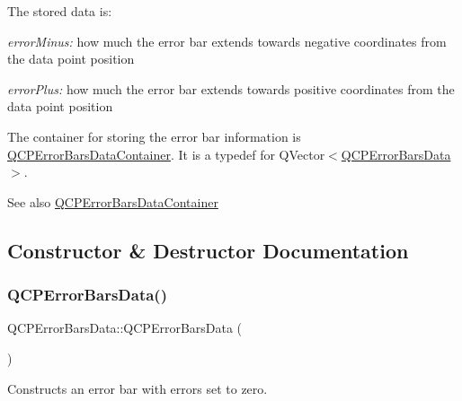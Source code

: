 The stored data is\+: \begin{DoxyItemize}
\item {\itshape error\+Minus\+:} how much the error bar extends towards negative coordinates from the data point position \item {\itshape error\+Plus\+:} how much the error bar extends towards positive coordinates from the data point position\end{DoxyItemize}
The container for storing the error bar information is \hyperlink{qcustomplot_8h_a8c4472a4da738e0ddbf6b03222c39906}{Q\+C\+P\+Error\+Bars\+Data\+Container}. It is a typedef for {\ttfamily Q\+Vector$<$\hyperlink{class_q_c_p_error_bars_data}{Q\+C\+P\+Error\+Bars\+Data}$>$}.

\begin{DoxySeeAlso}{See also}
\hyperlink{qcustomplot_8h_a8c4472a4da738e0ddbf6b03222c39906}{Q\+C\+P\+Error\+Bars\+Data\+Container} 
\end{DoxySeeAlso}


\subsection{Constructor \& Destructor Documentation}
\mbox{\label{class_q_c_p_error_bars_data_ac18bdb46dec56f8df7f3c99d058cc725}} 
\subsubsection{\texorpdfstring{Q\+C\+P\+Error\+Bars\+Data()}{QCPErrorBarsData()}\hspace{0.1cm}{\footnotesize\ttfamily [1/3]}}
{\footnotesize\ttfamily Q\+C\+P\+Error\+Bars\+Data\+::\+Q\+C\+P\+Error\+Bars\+Data (\begin{DoxyParamCaption}{ }\end{DoxyParamCaption})}

Constructs an error bar with errors set to zero. \mbox{\label{class_q_c_p_error_bars_data_a73ebdaa55fa7f0052b70895b28edb444}} 
